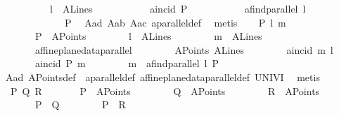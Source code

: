 \begin{isabellebody}
\ \ \ \ \ \ \ \ \ \ l\ {\isasymin}\ A{}Lines\ {\isasymlongrightarrow}\isanewline
\ \ \ \ \ \ \ \ \ \ a{}incid\ P\isanewline
\ \ \ \ \ \ \ \ \ \ \ {\isacharparenleft}{\kern0pt}a{}find{\isacharunderscore}{\kern0pt}parallel\ l\isanewline
\ \ \ \ \ \ \ \ \ \ \ \ \ P{\isacharparenright}{\kern0pt}{\isachardoublequoteclose}\ \isamarkupfalse%
\ A{}{\isacharunderscore}{\kern0pt}a{}d\ A{}{\isacharunderscore}{\kern0pt}a{}b\ A{}{\isacharunderscore}{\kern0pt}a{}c\ a{}parallel{\isacharunderscore}{\kern0pt}def\ \isamarkupfalse%
\ metis\isanewline
{}\isamarkupfalse%
\isanewline
\ \ \isamarkupfalse%
\ {\isachardoublequoteopen}{\isasymforall}P\ l\ m{\isachardot}{\kern0pt}\isanewline
\ \ \ \ \ \ \ P\ {\isasymin}\ A{}Points\ {\isasymlongrightarrow}\isanewline
\ \ \ \ \ \ \ l\ {\isasymin}\ A{}Lines\ {\isasymlongrightarrow}\isanewline
\ \ \ \ \ \ \ m\ {\isasymin}\ A{}Lines\ {\isasymlongrightarrow}\isanewline
\ \ \ \ \ \ \ affine{\isacharunderscore}{\kern0pt}plane{\isacharunderscore}{\kern0pt}data{\isachardot}{\kern0pt}parallel\isanewline
\ \ \ \ \ \ \ \ A{}Points\ A{}Lines\isanewline
\ \ \ \ \ \ \ \ a{}incid\ m\ l\ {\isasymlongrightarrow}\isanewline
\ \ \ \ \ \ \ a{}incid\ P\ m\ {\isasymlongrightarrow}\isanewline
\ \ \ \ \ \ \ m\ {\isacharequal}{\kern0pt}\ a{}find{\isacharunderscore}{\kern0pt}parallel\ l\ P{\isachardoublequoteclose}\ \isamarkupfalse%
\ A{}{\isacharunderscore}{\kern0pt}a{}d\ A{}Points{\isacharunderscore}{\kern0pt}def\ \ a{}parallel{\isacharunderscore}{\kern0pt}def\ affine{\isacharunderscore}{\kern0pt}plane{\isacharunderscore}{\kern0pt}data{\isachardot}{\kern0pt}parallel{\isacharunderscore}{\kern0pt}def\ UNIV{\isacharunderscore}{\kern0pt}I\ \isamarkupfalse%
\ metis\ \isanewline
\ \ \isamarkupfalse%
\ {}{\isacharcolon}{\kern0pt}\ {\isachardoublequoteopen}{\isasymexists}P\ Q\ R{\isachardot}{\kern0pt}\isanewline
\ \ \ \ \ \ \ P\ {\isasymin}\ A{}Points\ {\isasymand}\isanewline
\ \ \ \ \ \ \ Q\ {\isasymin}\ A{}Points\ {\isasymand}\isanewline
\ \ \ \ \ \ \ R\ {\isasymin}\ A{}Points\ {\isasymand}\isanewline
\ \ \ \ \ \ \ P\ {\isasymnoteq}\ Q\ {\isasymand}\isanewline
\ \ \ \ \ \ \ P\ {\isasymnoteq}\ R\ {\isasymand}\isanewline

\end{isabellebody}
